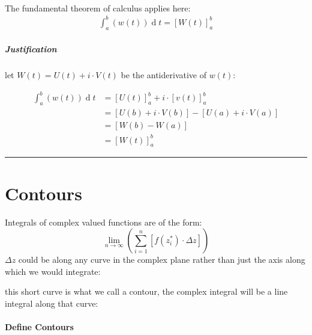 \documentclass[class=article, crop=false]{standalone}
\begin{document}
~\\
The fundamental theorem of calculus applies here: \[
\begin{aligned}
         \int^{b}_{a}\left( w\left( t \right)  \right) \operatorname{d}t =  \left[ W\left( t \right)  \right]^b_a 
          \label{ftcest}
        \end{aligned}
        \]

\hypertarget{justification}{%
\subparagraph{Justification}\label{justification}}

let
\(W\left( t \right) = U\left( t \right) + i \cdot V\left( t \right)\) be
the antiderivative of \(w\left( t \right)\):

\[
\begin{aligned}
          \int^{b}_{a}\left( w \left( t \right)  \right) \operatorname{d}t &= \left[ U\left( t \right)  \right]^b_a + i\cdot \left[ v\left( t \right)  \right]^b_a \\
          &= \left[ U\left( b \right) + i\cdot V\left( b \right)  \right] -\left[ U\left( a \right) +  i \cdot V\left( a \right)  \right]  \\
          &= \left[ W\left( b \right) - W\left( a \right)  \right] \\
          &= \left[ W\left( t \right)  \right]^b_a
        \end{aligned}
        \]

\begin{center}\rule{0.5\linewidth}{0.5pt}\end{center}

\hypertarget{contours}{%
\section{Contours}\label{contours}}

Integrals of complex valued functions are of the form:
\[\lim_{n     \rightarrow \infty}\left( \sum^{n}_{i= 1}\left[ f\left( z^*_i \right) \cdot \Delta z \right]  \right)\]
\(\Delta z\) could be along any curve in the complex plane rather than
just the axis along which we would integrate:

this short curve is what we call a contour, the complex integral will be
a line integral along that curve:

\hypertarget{define-contours}{%
\paragraph{Define Contours}\label{define-contours}}
\end{document}
